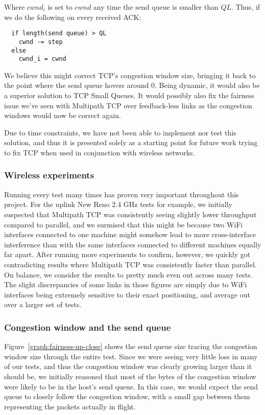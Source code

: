 Where $cwnd_i$ is set to $cwnd$ any time the send queue is smaller than $QL$.
Thus, if we do the following on every received ACK:

\begin{verbatim}
  if length(send queue) > QL
    cwnd -= step
  else
    cwnd_i = cwnd
\end{verbatim}

We believe this might correct TCP's congestion window size, bringing it back to
the point where the send queue hovers around 0. Being dynamic, it would also be
a superior solution to TCP Small Queues. It would possibly also fix the fairness
issue we've seen with Multipath TCP over feedback-less links as the congestion
windows would now be correct again.

Due to time constraints, we have not been able to implement nor test this
solution, and thus it is presented solely as a starting point for future work
trying to fix TCP when used in conjunction with wireless networks.

\subsubsection{Wireless experiments}
Running every test many times has proven very important throughout this project.
For the uplink New Reno 2.4 GHz tests for example, we initially suspected that
Multipath TCP was consistently seeing slightly lower throughput compared to
parallel, and we surmised that this might be because two WiFi interfaces
connected to one machine might somehow lead to more cross-interface interference
than with the same interfaces connected to different machines equally far apart.
After running more experiments to confirm, however, we quickly got contradicting
results where Multipath TCP was consistently faster than parallel. On balance,
we consider the results to pretty much even out across many tests. The slight
discrepancies of some links in those figures are simply due to WiFi interfaces
being extremely sensitive to their exact positioning, and average out over a
larger set of tests.

\subsubsection{Congestion window and the send queue}
Figure~\ref{graph:fairness-up-close} shows the send queue size tracing the
congestion window size through the entire test. Since we were seeing very
little loss in many of our tests, and thus the congestion window was clearly
growing larger than it should be, we initially reasoned that most of the bytes
of the congestion window were likely to be in the host's send queue. In this
case, we would expect the send queue to closely follow the congestion window,
with a small gap between them representing the packets actually in flight.

